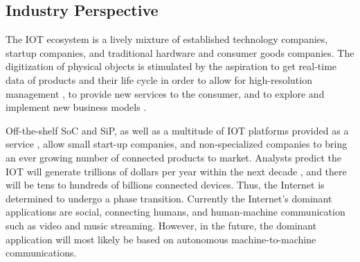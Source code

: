 




\subsection{Industry Perspective}

The \ac{IOT} ecosystem is a lively mixture of established technology companies, startup companies, and traditional hardware and consumer goods companies. The digitization of physical objects is stimulated by the aspiration to get real-time data of products and their life cycle in order to allow for high-resolution management \parencite{fleisch2010internet}, to provide new services to the consumer, and to explore and implement new business models \parencite{Fleisch2015}.	

Off-the-shelf \ac{SoC} and \ac{SiP}, as well as a multitude of \ac{IOT} platforms provided as a service \parencite{ISI:000379632700002}, allow small start-up companies, and non-specialized companies to bring an ever growing number of connected products to market. Analysts predict the \ac{IOT} will generate trillions of dollars per year within the next decade \parencite{manyika2015unlocking}, and there will be tens to hundreds of billions connected devices. Thus, the Internet is determined to undergo a phase transition. Currently the Internet's dominant applications are social, connecting humans, and human-machine communication such as video and music streaming. However, in the future, the dominant application will most likely be based on autonomous machine-to-machine communications. 

